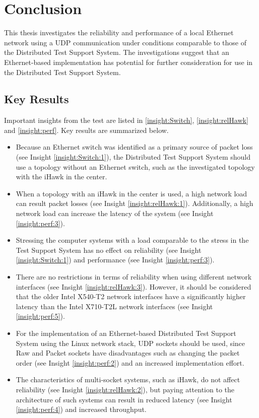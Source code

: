 \chapter{Conclusion} \label{chap:Conclusion}
This thesis investigates the reliability and performance of a local Ethernet network using a UDP communication under conditions comparable to those of the Distributed Test Support System. The investigations suggest that an Ethernet-based implementation has potential for further consideration for use in the Distributed Test Support System.

\section{Key Results} \label{chap:KeyResults}
Important insights from the test are listed in \ref{insight:Switch}, \ref{insight:relHawk} and \ref{insight:perf}. Key results are summarized below.

\begin{itemize}
	\item Because an Ethernet switch was identified as a primary source of packet loss (see Insight \ref{insight:Switch:1}), the Distributed Test Support System should use a topology without an Ethernet switch, such as the investigated topology with the iHawk in the center.
	\item When a topology with an iHawk in the center is used, a high network load can result packet losses (see Insight \ref{insight:relHawk:1}). Additionally, a high network load can increase the latency of the system (see Insight \ref{insight:perf:3}).
	\item Stressing the computer systems with a load comparable to the stress in the Test Support System has no effect on reliability (see Insight \ref{insight:Switch:1}) and performance (see Insight \ref{insight:perf:3}).
	\item There are no restrictions in terms of reliability when using different network interfaces (see Insight \ref{insight:relHawk:3}). However, it should be considered that the older Intel X540-T2 network interfaces have a significantly higher latency than the Intel X710-T2L network interfaces (see Insight \ref{insight:perf:5}).
	\item For the implementation of an Ethernet-based Distributed Test Support System using the Linux network stack, UDP sockets should be used, since Raw and Packet sockets have disadvantages such as changing the packet order (see Insight \ref{insight:perf:2}) and an increased implementation effort.
	\item The characteristics of multi-socket systems, such as iHawk, do not affect reliability (see Insight \ref{insight:relHawk:2}), but paying attention to the architecture of such systems can result in reduced latency (see Insight \ref{insight:perf:4}) and increased throughput.
\end{itemize}


